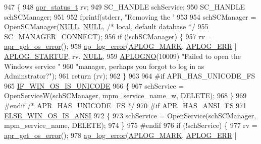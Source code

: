 \begin{DoxyCode}
947 \{
948     \hyperlink{group__apr__errno_gaa5105fa83cc322f09382292db8b47593}{apr\_status\_t} rv;
949     SC\_HANDLE schService;
950     SC\_HANDLE schSCManager;
951 
952     fprintf(stderr, \textcolor{stringliteral}{"Removing the '%
953 
954     schSCManager = OpenSCManager(\hyperlink{pcre_8txt_ad7f989d16aa8ca809a36bc392c07fba1}{NULL}, \hyperlink{pcre_8txt_ad7f989d16aa8ca809a36bc392c07fba1}{NULL}, \textcolor{comment}{/* local, default database */}
955                                  SC\_MANAGER\_CONNECT);
956     \textcolor{keywordflow}{if} (!schSCManager) \{
957         rv = \hyperlink{group__apr__errno_gaa76e122da00af0ce2e8c8d7ff538bdfa}{apr\_get\_os\_error}();
958         \hyperlink{group__APACHE__CORE__LOG_ga5e6676c87418af7a1d323a116c78ecb4}{ap\_log\_error}(\hyperlink{group__APACHE__CORE__LOG_ga655e126996849bcb82e4e5a14c616f4a}{APLOG\_MARK}, \hyperlink{group__APACHE__CORE__LOG_ga57ad94ed8c92c4306de90479251a5d58}{APLOG\_ERR} | 
      \hyperlink{group__APACHE__CORE__LOG_ga39efd19b052fb6f39d8f263c16cc82b7}{APLOG\_STARTUP}, rv, \hyperlink{pcre_8txt_ad7f989d16aa8ca809a36bc392c07fba1}{NULL},
959                      \hyperlink{group__APACHE__CORE__LOG_ga1dee8a07e06bc5b3de8b89662c2cd666}{APLOGNO}(10009)  \textcolor{stringliteral}{"Failed to open the Windows service "}
960                      \textcolor{stringliteral}{"manager, perhaps you forgot to log in as Adminstrator?"});
961         \textcolor{keywordflow}{return} (rv);
962     \}
963 
964 \textcolor{preprocessor}{#if APR\_HAS\_UNICODE\_FS}
965     \hyperlink{win32_2apr__arch__misc_8h_a8c631486790f65bd87ed0623a25bdd3d}{IF\_WIN\_OS\_IS\_UNICODE}
966     \{
967         schService = OpenServiceW(schSCManager, mpm\_service\_name\_w, DELETE);
968     \}
969 \textcolor{preprocessor}{#endif }\textcolor{comment}{/* APR\_HAS\_UNICODE\_FS */}\textcolor{preprocessor}{}
970 \textcolor{preprocessor}{#if APR\_HAS\_ANSI\_FS}
971     \hyperlink{win32_2apr__arch__misc_8h_a2d1423da7a6a46da1276017c8140be22}{ELSE\_WIN\_OS\_IS\_ANSI}
972     \{
973         schService = OpenService(schSCManager, mpm\_service\_name, DELETE);
974     \}
975 \textcolor{preprocessor}{#endif}
976     \textcolor{keywordflow}{if} (!schService) \{
977         rv = \hyperlink{group__apr__errno_gaa76e122da00af0ce2e8c8d7ff538bdfa}{apr\_get\_os\_error}();
978         \hyperlink{group__APACHE__CORE__LOG_ga5e6676c87418af7a1d323a116c78ecb4}{ap\_log\_error}(\hyperlink{group__APACHE__CORE__LOG_ga655e126996849bcb82e4e5a14c616f4a}{APLOG\_MARK}, \hyperlink{group__APACHE__CORE__LOG_ga57ad94ed8c92c4306de90479251a5d58}{APLOG\_ERR} | 
}
\end{DoxyCode}
